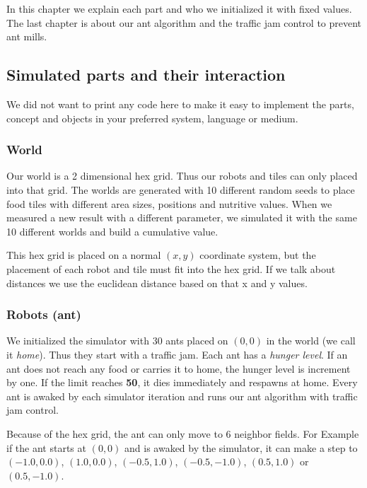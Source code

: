 In this chapter we explain each part and who we initialized it with
fixed values. The last chapter is about our ant algorithm and the
traffic jam control to prevent ant mills.

\subsection{Simulated parts and their
interaction}\label{simulated-parts-and-their-interaction}

We did not want to print any code here to make it easy to implement the
parts, concept and objects in your preferred system, language or medium.

\subsubsection{World}\label{world}

Our world is a 2 dimensional hex grid. Thus our robots and tiles can
only placed into that grid. The worlds are generated with 10 different
random seeds to place food tiles with different area sizes, positions
and nutritive values. When we measured a new result with a different
parameter, we simulated it with the same 10 different worlds and build a
cumulative value.

This hex grid is placed on a normal \((x,y)\) coordinate system, but the
placement of each robot and tile must fit into the hex grid. If we talk
about distances we use the euclidean distance based on that x and y
values.

\subsubsection{Robots (ant)}\label{robots-ant}

We initialized the simulator with 30 ants placed on \((0,0)\) in the
world (we call it \emph{home}). Thus they start with a traffic jam. Each
ant has a \emph{hunger level}. If an ant does not reach any food or
carries it to home, the hunger level is increment by one. If the limit
reaches \textbf{50}, it dies immediately and respawns at home. Every ant
is awaked by each simulator iteration and runs our ant algorithm with
traffic jam control.

Because of the hex grid, the ant can only move to 6 neighbor fields. For
Example if the ant starts at \((0,0)\) and is awaked by the simulator,
it can make a step to \((-1.0, 0.0)\), \((1.0, 0.0)\), \((-0.5, 1.0)\),
\((-0.5, -1.0)\), \((0.5, 1.0)\) or \((0.5, -1.0)\).

